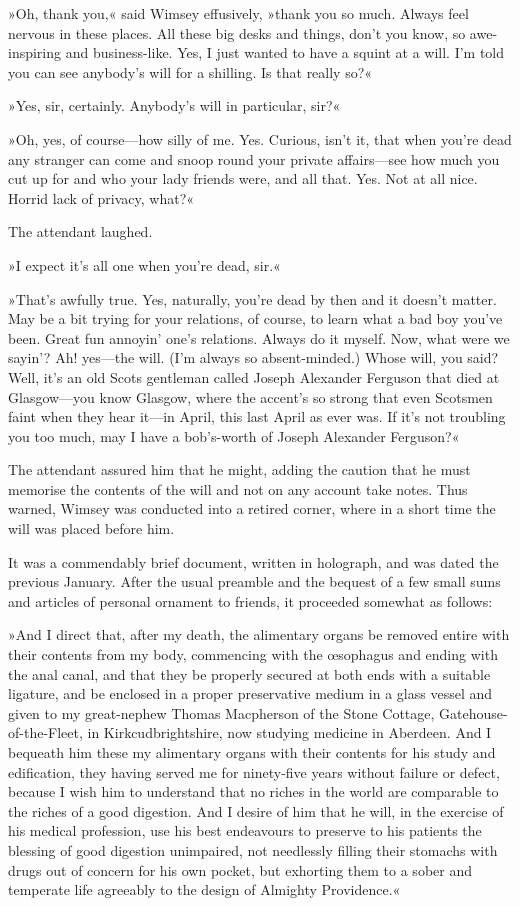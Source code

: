 »Oh, thank you,« said Wimsey effusively, »thank you so much. Always feel nervous in these places. All these big desks and things, don't you know, so awe-inspiring and business-like. Yes, I just wanted to have a squint at a will. I'm told you can see anybody's will for a shilling. Is that really so?«

»Yes, sir, certainly. Anybody's will in particular, sir?«

»Oh, yes, of course—how silly of me. Yes. Curious, isn't it, that when you're dead any stranger can come and snoop round your private affairs—see how much you cut up for and who your lady friends were, and all that. Yes. Not at all nice. Horrid lack of privacy, what?«

The attendant laughed.

»I expect it's all one when you're dead, sir.«

»That's awfully true. Yes, naturally, you're dead by then and it doesn't matter. May be a bit trying for your relations, of course, to learn what a bad boy you've been. Great fun annoyin' one's relations. Always do it myself. Now, what were we sayin'? Ah! yes—the will. (I'm always so absent-minded.) Whose will, you said? Well, it's an old Scots gentleman called Joseph Alexander Ferguson that died at Glasgow—you know Glasgow, where the accent's so strong that even Scotsmen faint when they hear it—in April, this last April as ever was. If it's not troubling you too much, may I have a bob's-worth of Joseph Alexander Ferguson?«

The attendant assured him that he might, adding the caution that he must memorise the contents of the will and not on any account take notes. Thus warned, Wimsey was conducted into a retired corner, where in a short time the will was placed before him.

It was a commendably brief document, written in holograph, and was dated the previous January. After the usual preamble and the bequest of a few small sums and articles of personal ornament to friends, it proceeded somewhat as follows:

»And I direct that, after my death, the alimentary organs be removed entire with their contents from my body, commencing with the œsophagus and ending with the anal canal, and that they be properly secured at both ends with a suitable ligature, and be enclosed in a proper preservative medium in a glass vessel and given to my great-nephew Thomas Macpherson of the Stone Cottage, Gatehouse-of-the-Fleet, in Kirkcudbrightshire, now studying medicine in Aberdeen. And I bequeath him these my alimentary organs with their contents for his study and edification, they having served me for ninety-five years without failure or defect, because I wish him to understand that no riches in the world are comparable to the riches of a good digestion. And I desire of him that he will, in the exercise of his medical profession, use his best endeavours to preserve to his patients the blessing of good digestion unimpaired, not needlessly filling their stomachs with drugs out of concern for his own pocket, but exhorting them to a sober and temperate life agreeably to the design of Almighty Providence.«

